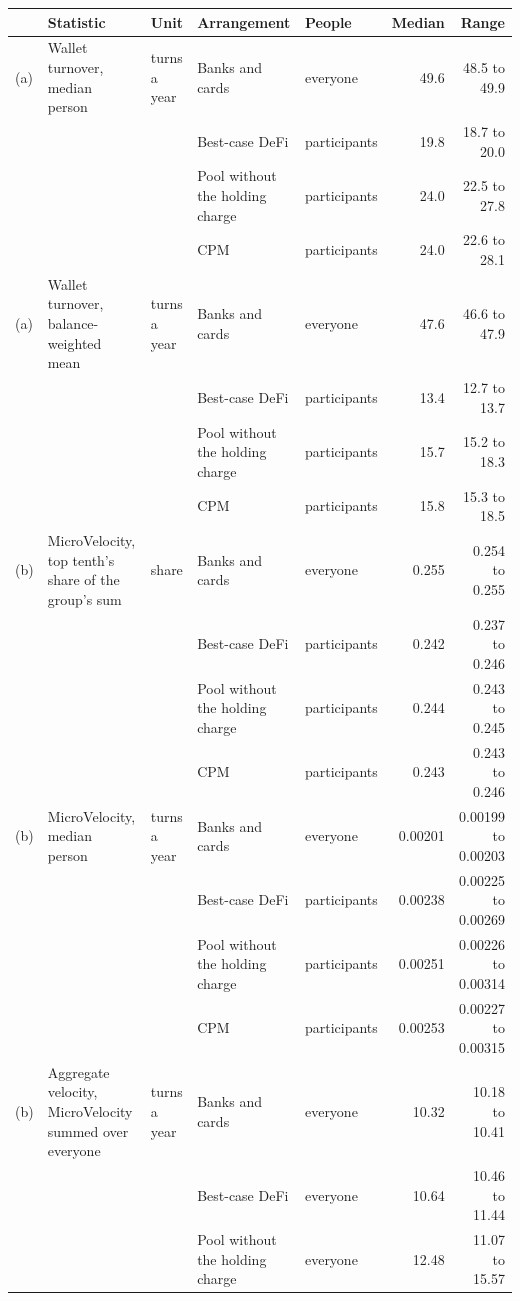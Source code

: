 \begin{tabular}{lllllrr}
\toprule
 & Statistic & Unit & Arrangement & People & Median & Range \\
\midrule
(a) & Wallet turnover, median person & turns a year & Banks and cards & everyone & 49.6 & 48.5 to 49.9 \\
 &  &  & Best-case DeFi & participants & 19.8 & 18.7 to 20.0 \\
 &  &  & Pool without the holding charge & participants & 24.0 & 22.5 to 27.8 \\
 &  &  & CPM & participants & 24.0 & 22.6 to 28.1 \\
\midrule
(a) & Wallet turnover, balance-weighted mean & turns a year & Banks and cards & everyone & 47.6 & 46.6 to 47.9 \\
 &  &  & Best-case DeFi & participants & 13.4 & 12.7 to 13.7 \\
 &  &  & Pool without the holding charge & participants & 15.7 & 15.2 to 18.3 \\
 &  &  & CPM & participants & 15.8 & 15.3 to 18.5 \\
\midrule
(b) & MicroVelocity, top tenth's share of the group's sum & share & Banks and cards & everyone & 0.255 & 0.254 to 0.255 \\
 &  &  & Best-case DeFi & participants & 0.242 & 0.237 to 0.246 \\
 &  &  & Pool without the holding charge & participants & 0.244 & 0.243 to 0.245 \\
 &  &  & CPM & participants & 0.243 & 0.243 to 0.246 \\
\midrule
(b) & MicroVelocity, median person & turns a year & Banks and cards & everyone & 0.00201 & 0.00199 to 0.00203 \\
 &  &  & Best-case DeFi & participants & 0.00238 & 0.00225 to 0.00269 \\
 &  &  & Pool without the holding charge & participants & 0.00251 & 0.00226 to 0.00314 \\
 &  &  & CPM & participants & 0.00253 & 0.00227 to 0.00315 \\
\midrule
(b) & Aggregate velocity, MicroVelocity summed over everyone & turns a year & Banks and cards & everyone & 10.32 & 10.18 to 10.41 \\
 &  &  & Best-case DeFi & everyone & 10.64 & 10.46 to 11.44 \\
 &  &  & Pool without the holding charge & everyone & 12.48 & 11.07 to 15.57 \\

\end{tabular}

